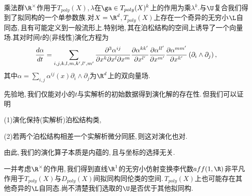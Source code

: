 乘法群$\R^{\times}$作用于$T_{poly}(X)$,\,$\lambda $在$\ga\in T_{poly}(X)^k$上的作用为乘$\lambda ^k$.与$\U$复合我们得到了拟同构的一个单参数族.对$X=\R^d$,\,$T_{poly}(X)$上存在一个奇异的无穷小$\L$自同态,\,且有可能定义到一般流形上.特别地,\,其在泊松结构的空间上诱导了一个向量场.其对时间$t$的(非线性)演化方程为
$${d\alpha\over dt}=\sum_{i,j,k,l,m,k',l',m'}{\partial^3\alpha^{ij}
        \over \partial x^k\partial x^l\partial x^m} 
        {\partial\alpha^{k k'}\over \partial x^{l'}}
        {\partial\alpha^{l l'}\over \partial x^{m'}}
         {\partial\alpha^{m m'}\over \partial x^{k'}}
         \left({ \partial_i}
         \wedge { \partial_j}\right),$$
其中$\alpha=\sum_{i,j} \alpha^{ij}(x){\partial_i}
         \wedge {\partial_j}$为$\R^d$上的双向量场.

先验地,\,我们仅能对小的$t$与实解析的初始数据得到演化解的存在性.\,但我们可以证明

(1)演化保持(实解析)泊松结构类,\,

(2)若两个泊松结构相差一个实解析微分同胚,\,则这对演化也对.

由此,\,我们的演化算子本质是内蕴的,\,且与坐标的选择无关.

一并考虑$\R^{\times}$的作用,\,我们得到直线$\R^1$的无穷小仿射变换李代数$aff(1,\R)$非平凡作用于$T_{poly}(X)$与$D_{poly}(X)$间拟同构同伦类的空间.\,$T_{poly}(X)$上也可能存在其他奇异的$\L$自同态.尚不清楚我们选取的$\U$是否优于其他拟同构.